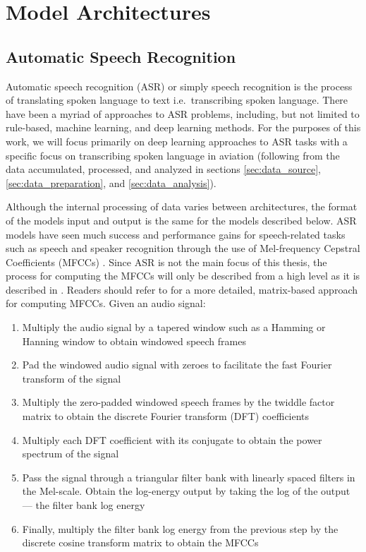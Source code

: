\documentclass[12pt]{article}
\begin{document}
\section{Model Architectures}

\subsection{Automatic Speech Recognition}\label{sec:automatic_speech_recognition}
Automatic speech recognition (ASR) or simply speech recognition is the process of translating spoken language to text i.e.~transcribing spoken
language. There have been a myriad of approaches to ASR problems, including, but not limited to rule-based, machine learning, and deep learning
methods. For the purposes of this work, we will focus primarily on deep learning approaches to ASR tasks with a specific focus on transcribing
spoken language in aviation (following from the data accumulated, processed, and analyzed in sections \ref{sec:data_source},
\ref{sec:data_preparation}, and \ref{sec:data_analysis}).

Although the internal processing of data varies between architectures, the format of the models input and output is the same for the models described
below. ASR models have seen much success and performance gains for speech-related tasks such as speech and speaker recognition through the use of
Mel-frequency Cepstral Coefficients (MFCCs) \cite{sahidullah_design_2012}. Since ASR is not the main focus of this thesis, the process for computing
the MFCCs will only be described from a high level as it is described in \cite{sahidullah_design_2012}. Readers should refer to
\cite{sahidullah_design_2012} for a more detailed, matrix-based approach for computing MFCCs. Given an audio signal:

\begin{enumerate}
    \item Multiply the audio signal by a tapered window such as a Hamming or Hanning window to obtain windowed speech frames
    \item Pad the windowed audio signal with zeroes to facilitate the fast Fourier transform of the signal
    \item Multiply the zero-padded windowed speech frames by the twiddle factor matrix to obtain the discrete Fourier transform (DFT) coefficients
    \item Multiply each DFT coefficient with its conjugate to obtain the power spectrum of the signal
    \item Pass the signal through a triangular filter bank with linearly spaced filters in the Mel-scale. Obtain the log-energy output by taking the
          log of the output --- the filter bank log energy
    \item Finally, multiply the filter bank log energy from the previous step by the discrete cosine transform matrix to obtain the MFCCs
\end{enumerate}
\end{document}
